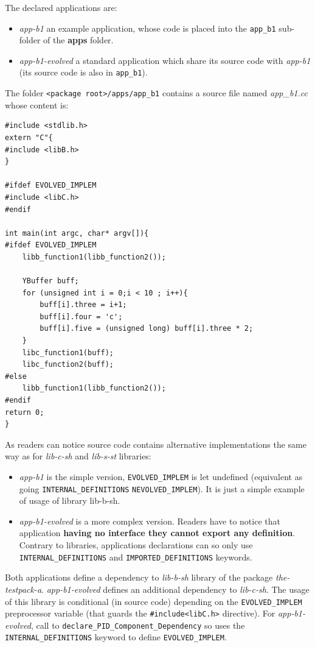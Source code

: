 \documentclass[12pt,a4paper]{article}
\begin{document}
The declared applications are:
\begin{itemize}
\item \textit{app-b1} an example application, whose code is placed into the \texttt{app\_b1} sub-folder of the \textbf{apps} folder.
\item \textit{app-b1-evolved} a standard application which share its source code with \textit{app-b1} (its source code is also in \texttt{app\_b1}).
\end{itemize}

The folder \texttt{<package root>/apps/app\_b1} contains a source file named \textit{app\_b1.cc} whose content is: 
\begin{verbatim}
#include <stdlib.h>
extern "C"{
#include <libB.h>
}

#ifdef EVOLVED_IMPLEM
#include <libC.h>
#endif

int main(int argc, char* argv[]){
#ifdef EVOLVED_IMPLEM
	libb_function1(libb_function2());

	YBuffer buff;
	for (unsigned int i = 0;i < 10 ; i++){	
		buff[i].three = i+1;
		buff[i].four = 'c';
		buff[i].five = (unsigned long) buff[i].three * 2;
	}
	libc_function1(buff);
	libc_function2(buff);
#else
	libb_function1(libb_function2());
#endif	
return 0;
}
\end{verbatim}
As readers can notice source code contains alternative implementations the same way as for \textit{lib-c-sh} and \textit{lib-s-st} libraries:
\begin{itemize}
\item \textit{app-b1} is the simple version, \texttt{EVOLVED\_IMPLEM} is let undefined (equivalent as going \texttt{INTERNAL\_DEFINITIONS} \texttt{NEVOLVED\_IMPLEM}). It is just a simple example of usage of library lib-b-sh.
\item \textit{app-b1-evolved} is a more complex version. Readers have to notice that application \textbf{having no interface they cannot export any definition}. Contrary to libraries, applications declarations can so only use \texttt{INTERNAL\_DEFINITIONS} and \texttt{IMPORTED\_DEFINITIONS} keywords.
\end{itemize}

Both applications define a dependency to \textit{lib-b-sh} library of the package \textit{the-testpack-a}. \textit{app-b1-evolved} defines an additional dependency to \textit{lib-c-sh}. The usage of this library is conditional (in source code) depending on the \texttt{EVOLVED\_IMPLEM} preprocessor variable (that guards the \texttt{\#include<libC.h>} directive). For \textit{app-b1-evolved}, call to \texttt{declare\_PID\_Component\_Dependency} so uses the \texttt{INTERNAL\_DEFINITIONS} keyword to define \texttt{EVOLVED\_IMPLEM}.
\end{document}
